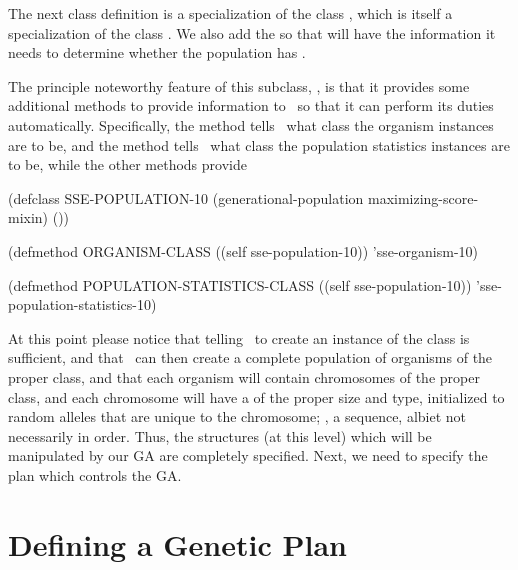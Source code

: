\filbreak

The next class definition is a specialization of the class
, which is itself a specialization of the class
. We also add the  so that
 will have the information it needs to determine whether the
population has .

\filbreak

{\samepage

The principle noteworthy feature of this subclass,
, is that it provides some additional methods to
provide information to \geco\ so that it can perform its duties
automatically. Specifically, the  method tells \geco\ what
class the organism instances are to be, and the
 method tells \geco\ what class the population
statistics instances are to be, while the other methods provide
\begin{clcode}(defclass SSE-POPULATION-10 (generational-population maximizing-score-mixin)
  ())

(defmethod ORGANISM-CLASS ((self sse-population-10))
  'sse-organism-10)

(defmethod POPULATION-STATISTICS-CLASS ((self sse-population-10))
  'sse-population-statistics-10)\end{clcode}

}%

\filbreak

{\samepage

At this point please notice that telling \geco\ to create an instance of the class
 is sufficient, and that \geco\ can then create a
complete population of organisms of the proper class, and that each organism will
contain chromosomes of the proper class, and each chromosome will have a  of the proper size and type, initialized to random
alleles that are unique to the chromosome; \ie, a sequence, albiet not necessarily in order.
Thus, the structures (at this level) which will be manipulated by our GA are
completely specified. Next, we need to specify the plan which controls
the GA.

}%

\filbreak


\section{Defining a Genetic Plan}

